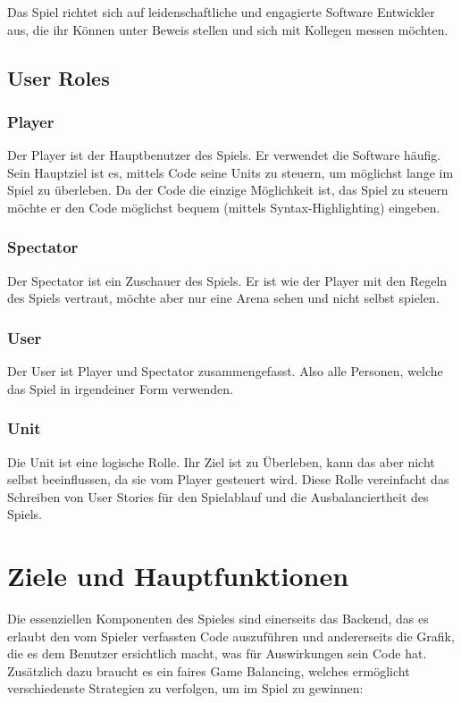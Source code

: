 \documentclass[a4paper, 11pt]{scrartcl}
\let\oldsection\section
\renewcommand\section{\clearpage\oldsection}
\begin{document}
Das Spiel richtet sich auf leidenschaftliche und engagierte Software Entwickler aus, die ihr Können unter Beweis stellen und sich mit Kollegen messen möchten.

\subsection{User Roles}
\subsubsection{Player}
Der Player ist der Hauptbenutzer des Spiels. Er verwendet die Software häufig. Sein Hauptziel ist es, mittels Code seine Units zu steuern, um möglichst lange im Spiel zu überleben. Da der Code die einzige Möglichkeit ist, das Spiel zu steuern möchte er den Code möglichst bequem (mittels Syntax-Highlighting) eingeben.
\subsubsection{Spectator}
Der Spectator ist ein Zuschauer des Spiels. Er ist wie der Player mit den Regeln des Spiels vertraut, möchte aber nur eine Arena sehen und nicht selbst spielen.
\subsubsection{User}
Der User ist Player und Spectator zusammengefasst. Also alle Personen, welche das Spiel in irgendeiner Form verwenden.
\subsubsection{Unit}
Die Unit ist eine logische Rolle. Ihr Ziel ist zu Überleben, kann das aber nicht selbst beeinflussen, da sie vom Player gesteuert wird. Diese Rolle vereinfacht das Schreiben von User Stories für den Spielablauf und die Ausbalanciertheit des Spiels.

\section{Ziele und Hauptfunktionen}

Die essenziellen Komponenten des Spieles sind einerseits das Backend, das es erlaubt den vom Spieler verfassten Code auszuführen und andererseits die Grafik, die es dem Benutzer ersichtlich macht, was für Auswirkungen sein Code hat. Zusätzlich dazu braucht es ein faires Game Balancing, welches ermöglicht verschiedenste Strategien zu verfolgen, um im Spiel zu gewinnen:
\end{document}
